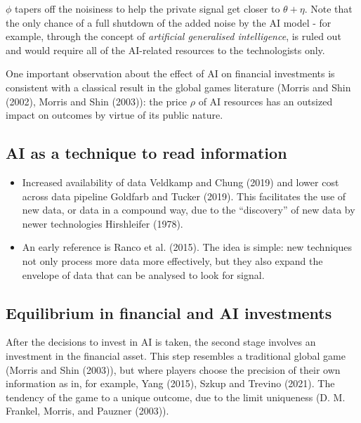 \documentclass[
]{article}
\theoremstyle{plain}
\theoremstyle{remark}
\begin{document}
\(\phi\) tapers off the noisiness to help the private signal get closer
to \(\theta + \eta\). Note that the only chance of a full shutdown of
the added noise by the AI model - for example, through the concept of
\emph{artificial generalised intelligence}, is ruled out and would
require all of the AI-related resources to the technologists only.

One important observation about the effect of AI on financial
investments is consistent with a classical result in the global games
literature (Morris and Shin (2002), Morris and Shin (2003)): the price
\(\rho\) of AI resources has an outsized impact on outcomes by virtue of
its public nature.

\hypertarget{ai-as-a-technique-to-read-information}{%
\subsection{AI as a technique to read
information}\label{ai-as-a-technique-to-read-information}}

\begin{itemize}
\item
  Increased availability of data Veldkamp and Chung (2019) and lower
  cost across data pipeline Goldfarb and Tucker (2019). This facilitates
  the use of new data, or data in a compound way, due to the
  ``discovery'' of new data by newer technologies Hirshleifer (1978).
\item
  An early reference is Ranco et al. (2015). The idea is simple: new
  techniques not only process more data more effectively, but they also
  expand the envelope of data that can be analysed to look for signal.
\end{itemize}

\hypertarget{equilibrium-in-financial-and-ai-investments}{%
\subsection{Equilibrium in financial and AI
investments}\label{equilibrium-in-financial-and-ai-investments}}

After the decisions to invest in AI is taken, the second stage involves
an investment in the financial asset. This step resembles a traditional
global game (Morris and Shin (2003)), but where players choose the
precision of their own information as in, for example, Yang (2015),
Szkup and Trevino (2021). The tendency of the game to a unique outcome,
due to the limit uniqueness (D. M. Frankel, Morris, and Pauzner (2003)).
\end{document}
